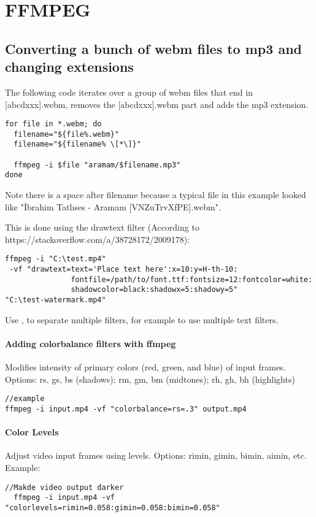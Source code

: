 \documentclass{article}
\begin{document}
\section{FFMPEG}
\subsection{Converting a bunch of webm files to mp3 and changing extensions}
The following code iterates over a group of webm files that end in [abcdxxx].webm, removes the [abcdxxx].webm part and adds the mp3 extension. 
\begin{verbatim}
for file in *.webm; do
  filename="${file%.webm}"
  filename="${filename% \[*\]}"

  ffmpeg -i $file "aramam/$filename.mp3"
done
\end{verbatim}
Note there is a space after filename because a typical file in this example looked like "İbrahim Tatlıses - Aramam [VNZuTrvXfPE].webm".

This is done using the drawtext filter (According to https://stackoverflow.com/a/38728172/2009178):
\begin{verbatim}
ffmpeg -i "C:\test.mp4"
 -vf "drawtext=text='Place text here':x=10:y=H-th-10:
               fontfile=/path/to/font.ttf:fontsize=12:fontcolor=white:
               shadowcolor=black:shadowx=5:shadowy=5"
"C:\test-watermark.mp4"

\end{verbatim}
Use , to separate multiple filters, for example to use multiple text filters. 

\paragraph{Adding colorbalance filters with ffmpeg}
Modifies intensity of primary colors (red, green, and blue) of input frames.
Options: rs, gs, bs (shadows); rm, gm, bm (midtones); rh, gh, bh (highlights)
\begin{verbatim}
//example
ffmpeg -i input.mp4 -vf "colorbalance=rs=.3" output.mp4
\end{verbatim}

\paragraph{Color Levels}
Adjust video input frames using levels.
Options: rimin, gimin, bimin, aimin, etc.
Example:
\begin{verbatim}
//Makde video output darker
  ffmpeg -i input.mp4 -vf "colorlevels=rimin=0.058:gimin=0.058:bimin=0.058"
\end{verbatim}
\end{document}
